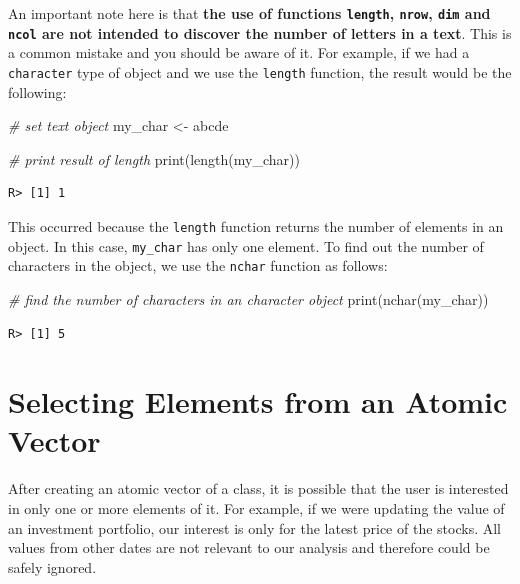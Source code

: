 \documentclass[
  12pt,
]{book}
\newenvironment{Shaded}{\begin{snugshade}}{\end{snugshade}}
\newcommand{\CommentTok}[1]{\textcolor[rgb]{0.37,0.37,0.37}{\textit{#1}}}
\newcommand{\FunctionTok}[1]{\textcolor[rgb]{0,0,0}{#1}}
\newcommand{\NormalTok}[1]{#1}
\newcommand{\OtherTok}[1]{\textcolor[rgb]{0.37,0.37,0.37}{#1}}
\newcommand{\StringTok}[1]{\textcolor[rgb]{0.5,0.5,0.5}{#1}}
\begin{document}
An important note here is that \textbf{the use of functions \texttt{length}, \texttt{nrow}, \texttt{dim} and \texttt{ncol} are not intended to discover the number of letters in a text}. This is a common mistake and you should be aware of it. For example, if we had a \texttt{character} type of object and we use the \texttt{length} function, the result would be the following:

\begin{Shaded}
\begin{Highlighting}[]
\CommentTok{\# set text object}
\NormalTok{my\_char }\OtherTok{\textless{}{-}} \StringTok{\textquotesingle{}abcde\textquotesingle{}}

\CommentTok{\# print result of length}
\FunctionTok{print}\NormalTok{(}\FunctionTok{length}\NormalTok{(my\_char))}
\end{Highlighting}
\end{Shaded}

\begin{verbatim}
R> [1] 1
\end{verbatim}

This occurred because the \texttt{length} function returns the number of elements in an object. In this case, \texttt{my\_char} has only one element. To find out the number of characters in the object, we use the \texttt{nchar} function as follows: 

\begin{Shaded}
\begin{Highlighting}[]
\CommentTok{\# find the number of characters in an character object}
\FunctionTok{print}\NormalTok{(}\FunctionTok{nchar}\NormalTok{(my\_char))}
\end{Highlighting}
\end{Shaded}

\begin{verbatim}
R> [1] 5
\end{verbatim}

\hypertarget{selecting-elements-from-an-atomic-vector}{%
\section{Selecting Elements from an Atomic Vector}\label{selecting-elements-from-an-atomic-vector}}

After creating an atomic vector of a class, it is possible that the user is interested in only one or more elements of it. For example, if we were updating the value of an investment portfolio, our interest is only for the latest price of the stocks. All values from other dates are not relevant to our analysis and therefore could be safely ignored.
\end{document}
